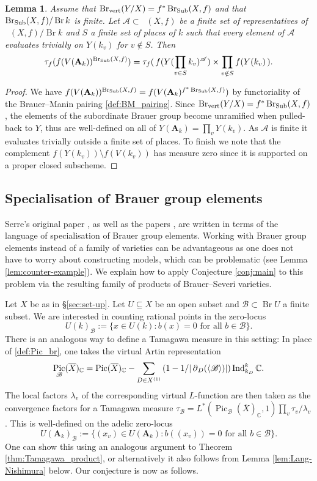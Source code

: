 \documentclass[a4paper,12pt,reqno]{amsart}
\numberwithin{equation}{section} \numberwithin{figure}{section}
\DeclareMathOperator{\Pic}{Pic} \DeclareMathOperator{\Div}{Div}
\DeclareMathOperator{\Br}{Br} \DeclareMathOperator{\Brnr}{Br_{nr}}
\DeclareMathOperator{\BrV}{Br_{vert}}
\newcommand{\Adele}{\mathbf{A}}
\newcommand{\br}{\mathscr{B}}
\newcommand\CC{\mathbb{C}}
\renewcommand{\#}{\sharp}
\newtheorem{lemma}{Lemma}
\theoremstyle{definition}
\numberwithin{lemma}{section}
\begin{document}
\begin{lemma} \label{lem:calculate_Tamagawa}
	Assume that $\BrV(Y/X) = f^*\Sub(X,f)$ and that $\Sub(X,f) / \Br k$ is finite.
	Let $\mathscr{A} \subset \BrV(X,f)$
	be a finite set of representatives	of $\BrV(X,f)/ \Br k$ and 
	$S$ a finite set of places of $k$ such that every element of $\mathscr{A}$ evaluates
	trivially on $Y(k_v)$ for $v \notin S$. Then
	$$\tau_f(f(V(\Adele_k))^{\Sub(X,f)}) = 
	\tau_f( \,f(Y(\prod_{v \in S} k_v)^\mathscr{A}) \times \prod_{v \notin S} f(Y(k_v) \,).$$
\end{lemma}
\begin{proof}
	We have $f(V(\Adele_k))^{\Sub(X,f)} = f( V(\Adele_k)^{f^*\Sub(X,f)})$ by functoriality
	of the Brauer--Manin pairing \eqref{def:BM_pairing}.
	Since $\BrV(Y/X) = f^*\Sub(X,f)$, the elements of the subordinate Brauer group
	become unramified when pulled-back to $Y$, thus are well-defined on all of $Y(\Adele_k)
	= \prod_v Y(k_v)$. As $\mathscr{A}$ is finite it evaluates trivially
	outside a finite set of places. To finish we note that 
	the complement $f(Y(k_v)) \setminus f(V(k_v))$ has measure zero since it is supported
	on a proper closed subscheme.
\end{proof}

\subsection{Specialisation of Brauer group elements}
Serre's original paper \cite{Ser90}, as well as the papers \cite{Lou18,LTBT20}, are written in terms of the language of specialisation of Brauer group elements. Working with Brauer group elements instead of a family of varieties can be advantageous as one does not have to worry about constructing models, which can be problematic (see Lemma \ref{lem:counter-example}). We explain  how to apply Conjecture \ref{conj:main} to this problem via the resulting family of products of Brauer--Severi varieties.

Let $X$ be as in \S \ref{sec:set-up}. Let $U \subseteq X$ be an open subset and $\br \subset \Br U$ a finite subset. We are interested in counting rational points in  the zero-locus 
$$U(k)_\br := \{x \in U(k) : b(x) = 0 \text{ for all } b \in \br \}.$$
There is an analogous way to define a Tamagawa measure in this setting: In place of \eqref{def:Pic_br}, one takes the virtual Artin representation
$$
	\Pic_{\br}(\overline{X})_\CC=\Pic(\overline{X})_\CC
	- \sum_{D \in X^{(1)}}\left(1-1/|\res_D(\langle\br\rangle)| \right)\Ind_{k_D}^k \CC.
$$
The local factors $\lambda_v$ of the corresponding virtual $L$-function are then taken as the convergence factors for a Tamagawa measure $\tau_{\br} = L^*(\Pic_\br(\overline{X})_\CC,1)\prod_v \tau_v /\lambda_v$. This is well-defined on the adelic zero-locus
$$U(\Adele_k)_\br := \{(x_v) \in U(\Adele_k) : b((x_v)) = 0 \text{ for all } b \in \br \}.$$
One can show this using an analogous argument to Theorem \ref{thm:Tamagawa_product}, or alternatively it also follows from Lemma \ref{lem:Lang-Nishimura} below.
Our conjecture is now as follows.
\end{document}
